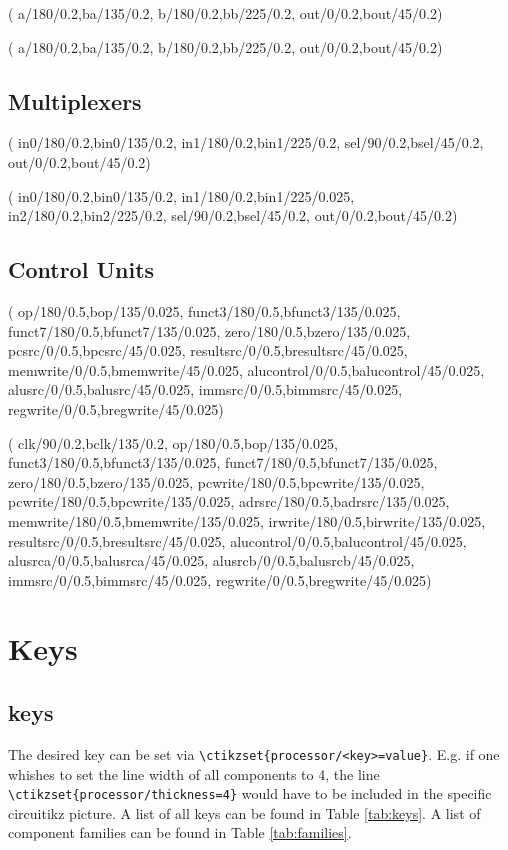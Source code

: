 \documentclass[.52pt,a4paper,titlepage]{article}
\begin{document}
(
a/180/0.2,ba/135/0.2,
b/180/0.2,bb/225/0.2,
out/0/0.2,bout/45/0.2)


(
a/180/0.2,ba/135/0.2,
b/180/0.2,bb/225/0.2,
out/0/0.2,bout/45/0.2)

\subsection{Multiplexers}
(
in0/180/0.2,bin0/135/0.2,
in1/180/0.2,bin1/225/0.2,
sel/90/0.2,bsel/45/0.2,
out/0/0.2,bout/45/0.2)

(
in0/180/0.2,bin0/135/0.2,
in1/180/0.2,bin1/225/0.025,
in2/180/0.2,bin2/225/0.2,
sel/90/0.2,bsel/45/0.2,
out/0/0.2,bout/45/0.2)

\subsection{Control Units}
(
op/180/0.5,bop/135/0.025,
funct3/180/0.5,bfunct3/135/0.025,
funct7/180/0.5,bfunct7/135/0.025,
zero/180/0.5,bzero/135/0.025,
pcsrc/0/0.5,bpcsrc/45/0.025,
resultsrc/0/0.5,bresultsrc/45/0.025,
memwrite/0/0.5,bmemwrite/45/0.025,
alucontrol/0/0.5,balucontrol/45/0.025,
alusrc/0/0.5,balusrc/45/0.025,
immsrc/0/0.5,bimmsrc/45/0.025,
regwrite/0/0.5,bregwrite/45/0.025)

(
clk/90/0.2,bclk/135/0.2,
op/180/0.5,bop/135/0.025,
funct3/180/0.5,bfunct3/135/0.025,
funct7/180/0.5,bfunct7/135/0.025,
zero/180/0.5,bzero/135/0.025,
pcwrite/180/0.5,bpcwrite/135/0.025,
pcwrite/180/0.5,bpcwrite/135/0.025,
adrsrc/180/0.5,badrsrc/135/0.025,
memwrite/180/0.5,bmemwrite/135/0.025,
irwrite/180/0.5,birwrite/135/0.025,
resultsrc/0/0.5,bresultsrc/45/0.025,
alucontrol/0/0.5,balucontrol/45/0.025,
alusrca/0/0.5,balusrca/45/0.025,
alusrcb/0/0.5,balusrcb/45/0.025,
immsrc/0/0.5,bimmsrc/45/0.025,
regwrite/0/0.5,bregwrite/45/0.025)


\section{Keys}
\subsection{\Circuitikz{} keys}
The desired \Circuitikz{} key can be set via \verb|\ctikzset{processor/<key>=value}|. E.g. if one whishes to set the line width of all components to 4, the line  \verb|\ctikzset{processor/thickness=4}| would have to be included in the specific circuitikz picture. A list of all \Circuitikz{} keys can be found in Table \ref{tab:keys}. A list of component families can be found in Table \ref{tab:families}.
\end{document}
